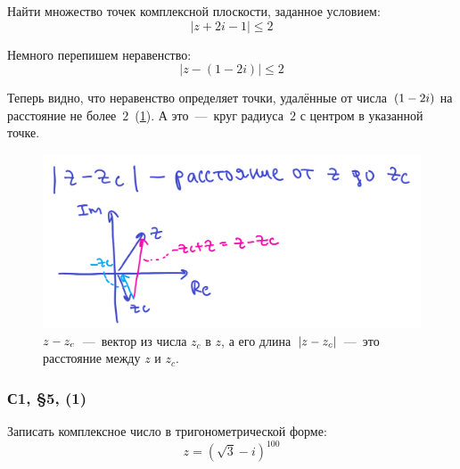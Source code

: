 \documentclass[a4paper,12pt]{article}
\begin{document}
  Найти множество точек комплексной плоскости, заданное условием:
  \[
    |z + 2i - 1| \leq 2
  \]
  
  \begin{solution}
    Немного перепишем неравенство:
    \[
      \bigl|z - (1 - 2i)\bigr| \leq 2
    \]

    Теперь видно, что неравенство определяет точки, удалённые от числа~$(1 \hm- 2i)$ на расстояние не более~$2$~(\ref{fig:z-zc}).
    А это~---~круг радиуса~$2$ с центром в указанной точке. %
    
    \begin{figure}[ht]
      \centering
      \includegraphics[width=0.8\linewidth]{images/z-zc}
    
      \caption{
        $z \hm- z_c$~---~вектор из числа $z_c$ в $z$, а его длина~$|z \hm- z_c|$~---~это расстояние между $z$ и $z_c$.
      }
      \label{fig:z-zc}
    \end{figure}
  \end{solution}


  \subsubsection{С1, \S 5, (1)}

  Записать комплексное число в тригонометрической форме:
  \[
    z = \left(\sqrt{3} - i\right)^{100}
  \]
\end{document}
